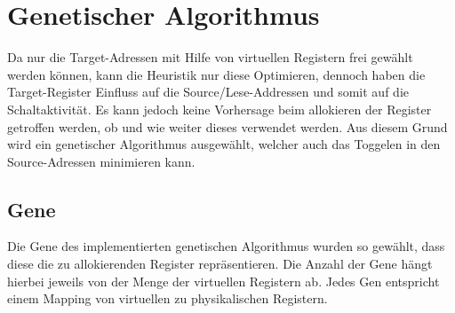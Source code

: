 %	

\section{Genetischer Algorithmus}
\label{sec:genetischerAlgorithmus}
Da nur die Target-Adressen mit Hilfe von virtuellen Registern frei gewählt werden können, kann die Heuristik nur diese Optimieren, dennoch haben die Target-Register Einfluss auf die Source/Lese-Addressen und somit auf die Schaltaktivität. Es kann jedoch keine Vorhersage beim allokieren der Register getroffen werden, ob und wie weiter dieses verwendet werden. Aus diesem Grund wird ein genetischer Algorithmus ausgewählt, welcher auch das Toggelen in den Source-Adressen minimieren kann.

\subsection{Gene}
Die Gene des implementierten genetischen Algorithmus wurden so gewählt, dass diese die zu allokierenden Register repräsentieren. Die Anzahl der Gene hängt hierbei jeweils von der Menge der virtuellen Registern ab. Jedes Gen entspricht einem Mapping von virtuellen zu physikalischen Registern.

